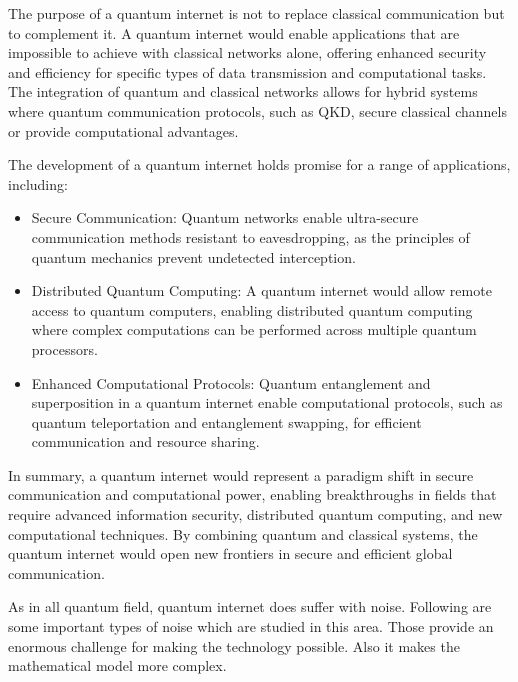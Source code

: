\documentclass{article}
\begin{document}
	The purpose of a quantum internet is not to replace classical communication but to complement it. A quantum internet would enable applications that are impossible to achieve with classical networks alone, offering enhanced security and efficiency for specific types of data transmission and computational tasks. The integration of quantum and classical networks allows for hybrid systems where quantum communication protocols, such as QKD, secure classical channels or provide computational advantages. \cite{vision_road_ahead}

	The development of a quantum internet holds promise for a range of applications, including:

	\begin{itemize}
		\item Secure Communication: Quantum networks enable ultra-secure communication methods resistant to eavesdropping, as the principles of quantum mechanics prevent undetected interception.
		\item Distributed Quantum Computing: A quantum internet would allow remote access to quantum computers, enabling distributed quantum computing where complex computations can be performed across multiple quantum processors.
		\item Enhanced Computational Protocols: Quantum entanglement and superposition in a quantum internet enable computational protocols, such as quantum teleportation and entanglement swapping, for efficient communication and resource sharing.
	\end{itemize}

	In summary, a quantum internet would represent a paradigm shift in secure communication and computational power, enabling breakthroughs in fields that require advanced information security, distributed quantum computing, and new computational techniques. By combining quantum and classical systems, the quantum internet would open new frontiers in secure and efficient global communication.

	As in all quantum field, quantum internet does suffer with noise. Following are some important types of noise which are studied in this area. Those provide an enormous challenge for making the technology possible. Also it makes the mathematical model more complex.
\end{document}
